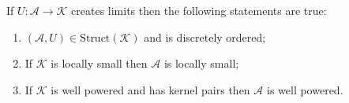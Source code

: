 If $U: \mathcal{A} \longrightarrow \mathcal{K}$ creates limits then the following statements are true:
\begin{enumerate}
\item $(\mathcal{A}, U) \in \text{Struct}(\mathcal{K})$ and is discretely ordered;
\item If $\mathcal{K}$ is locally small then $\mathcal{A}$ is locally small;
\item If $\mathcal{K}$ is well powered and has kernel pairs then $\mathcal{A}$ is well powered.
\end{enumerate}
